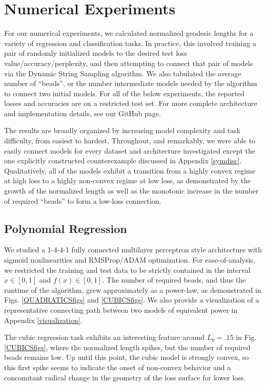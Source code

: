 \section{Numerical Experiments}
\label{sec:NumExp}

For our numerical experiments, we calculated normalized geodesic lengths for a variety of regression and classification tasks.  In practice, this involved training a pair of randomly initialized models to the desired test loss value/accuracy/perplexity, and then attempting to connect that pair of models via the Dynamic String Sampling algorithm.  We also tabulated the average number of ``beads'', or the number intermediate models needed by the algorithm to connect two initial models.  For all of the below experiments, the reported losses and accuracies are on a restricted test set.  For more complete architecture and implementation details, see our GitHub page.

The results are broadly organized by increasing model complexity and task difficulty, from easiest to hardest.  Throughout, and remarkably, we were able to easily connect models for every dataset and architecture investigated except the one explicitly constructed counterexample discussed in Appendix \ref{symdisc}.  Qualitatively, all of the models exhibit a transition from a highly convex regime at high loss to a highly non-convex regime at low loss, as demonstrated by the growth of the normalized length as well as the monotonic increase in the number of required ``beads'' to form a low-loss connection.


\subsection{Polynomial Regression}
\label{sec:PolyFuncs}

 We studied a 1-4-4-1 fully connected multilayer perceptron style architecture with sigmoid nonlinearities and RMSProp/ADAM optimization.  For ease-of-analysis, we restricted the training and test data to be strictly contained in the interval $x\in[0,1]$ and $f(x)\in[0,1]$.  The number of required beads, and thus the runtime of the algorithm, grew approximately as a power-law, as demonstrated in Figs. \ref{QUADRATICSfigs} and \ref{CUBICSfigs}.  We also provide a visualization of a representative connecting path between two models of equivalent power in Appendix \ref{visualization}.
 
 The cubic regression task exhibits an interesting feature around $L_0=.15$ in Fig. \ref{CUBICSfigs}, where the normalized length spikes, but the number of required beads remains low.  Up until this point, the cubic model is strongly convex, so this first spike seems to indicate the onset of non-convex behavior and a concomitant radical change in the geometry of the loss surface for lower loss.
 

